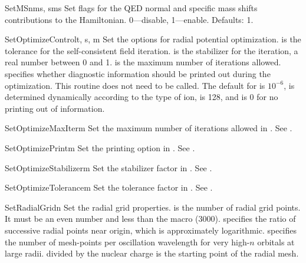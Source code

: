 \begin{fundesc}{SetMS}{nms, sms}
Set flags for the QED normal and specific mass shifts contributions to the
Hamiltonian. 0---disable, 1---enable. Defaults: 1.
\end{fundesc}

\begin{fundesc}{SetOptimizeControl}{t, s, m}
Set the options for radial potential optimization.  is the tolerance for
the self-consistent field iteration.  is the stabilizer for the
iteration, a real number between 0 and 1.  is the maximum number of
iterations allowed.   specifies whether diagnostic information should be
printed out during the optimization. This routine does not need to be called.
The default for  is $10^{-6}$,  is determined dynamically
according to the type of ion,  is 128, and  is 0 for no printing
out of information.
\end{fundesc}

\begin{fundesc}{SetOptimizeMaxIter}{m}
Set the maximum number of iterations allowed in . See
.
\end{fundesc}

\begin{fundesc}{SetOptimizePrint}{m}
Set the printing option in . See
.
\end{fundesc}

\begin{fundesc}{SetOptimizeStabilizer}{m}
Set the stabilizer factor in . See
.
\end{fundesc}

\begin{fundesc}{SetOptimizeTolerance}{m}
Set the tolerance factor in . See
.
\end{fundesc}

\begin{fundesc}{SetRadialGrid}{n}
Set the radial grid properties.  is the number of radial grid points. It
must be an even number and less than the macro  (3000). 
specifies the ratio of successive radial points near  origin, which is
approximately logarithmic.  specifies the number of mesh-points per
oscillation wavelength for very high-$n$ orbitals at large  radii. 
divided by the nuclear charge is the starting point of the radial mesh.
\end{fundesc}

